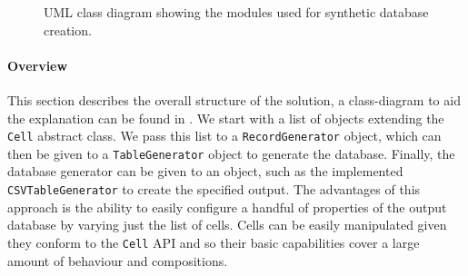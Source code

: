 \begin{figure}[t]
\caption{UML class diagram showing the modules used for synthetic database
creation.}
\label{fig:project:benchmark:creation-class-diagram}
\end{figure}

\paragraph{Overview} This section describes the overall structure of the
solution, a class-diagram to aid the explanation can be found in
.
We start with a list of objects extending the \lstinline{Cell}
abstract class. We pass this list to a \lstinline{RecordGenerator} object, which
can then be given to a \lstinline{TableGenerator} object to generate the
database. Finally, the database generator can be given to an object, such as the
implemented \lstinline{CSVTableGenerator} to create the
specified output. The advantages of this approach is the ability to easily
configure a handful of properties of the output database by varying just the list of cells.
Cells can be easily manipulated given they conform to the \lstinline{Cell} API
and so their basic capabilities cover a large amount of behaviour and
compositions.

